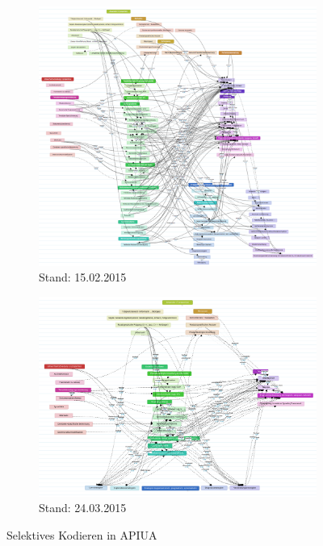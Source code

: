 \begin{figure}
        \centering
        \begin{subfigure}{0.48\linewidth}
                \includegraphics[width=\linewidth]{Figures/research/gt1.png}
                  \caption{Stand: 15.02.2015}
                \label{fig:research-gt1}
        \end{subfigure}%
        \hfill%
        \begin{subfigure}{0.48\linewidth}%
                \includegraphics[width=\linewidth]{Figures/research/gt2.png}
                \caption{Stand: 24.03.2015}
                \label{fig:research-gt2}
        \end{subfigure}%
        \caption{Selektives Kodieren in APIUA}%
\end{figure}


